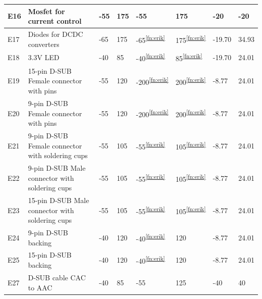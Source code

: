 \documentclass[a4paper,12pt,twoside]{article}
\begin{document}
\begin{longtable}{|m{1cm}|m{3.5cm}|m{1.3cm}|m{1.3cm}|m{1.4cm}|m{1.3cm}|m{1.3cm}|m{1.3cm}|}
E16 & Mosfet for current control & -55 & 175 & -55 & 175 & -20 & -20 \\ \hline
E17 & Diodes for DCDC converters & -65 & 175 & -65\textsuperscript{\ref{fn:erik}} & 175\textsuperscript{\ref{fn:erik}} & -19.70 & 34.93 \\ \hline
E18 & 3.3V LED & -40 & 85 & -40\textsuperscript{\ref{fn:erik}} & 85\textsuperscript{\ref{fn:erik}} & -19.70 & 24.01 \\ \hline 
E19 & 15-pin D-SUB Female connector with pins & -55 & 120 & -200\textsuperscript{\ref{fn:erik}} & 200\textsuperscript{\ref{fn:erik}} & -8.77 & 24.01 \\ \hline
E20 & 9-pin D-SUB Female connector with pins & -55 & 120  & -200\textsuperscript{\ref{fn:erik}} & 200\textsuperscript{\ref{fn:erik}} & -8.77 & 24.01 \\ \hline
E21 & 9-pin D-SUB Female connector with soldering cups & -55 & 105 & -55\textsuperscript{\ref{fn:erik}} & 105\textsuperscript{\ref{fn:erik}} & -8.77 & 24.01 \\ \hline
E22 & 9-pin D-SUB Male connector with soldering cups & -55 & 105 & -55\textsuperscript{\ref{fn:erik}} & 105\textsuperscript{\ref{fn:erik}} & -8.77 & 24.01 \\ \hline
E23 & 15-pin D-SUB Male connector with soldering cups & -55  & 105 & -55\textsuperscript{\ref{fn:erik}} & 105\textsuperscript{\ref{fn:erik}} & -8.77 & 24.01 \\ \hline
E24 & 9-pin D-SUB backing & -40 & 120 & -40\textsuperscript{\ref{fn:erik}} & 120 & -8.77 & 24.01  \\ \hline
E25 & 15-pin D-SUB backing & -40 & 120 & -40\textsuperscript{\ref{fn:erik}} & 120 & -8.77 & 24.01  \\ \hline
E27 & D-SUB cable CAC to AAC & -40 & 85 & -55 & 125 & -40 & 40 \\ \hline

\end{longtable}
\end{document}
